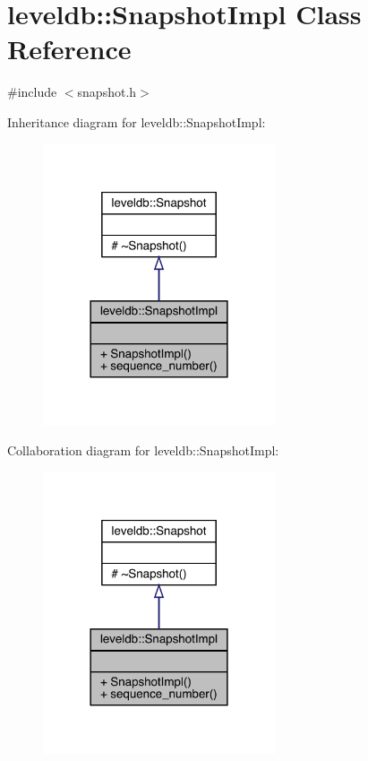 \hypertarget{classleveldb_1_1_snapshot_impl}{}\section{leveldb\+::Snapshot\+Impl Class Reference}
\label{classleveldb_1_1_snapshot_impl}


{\ttfamily \#include $<$snapshot.\+h$>$}



Inheritance diagram for leveldb\+::Snapshot\+Impl\+:
\nopagebreak
\begin{figure}[H]
\begin{center}
\leavevmode
\includegraphics[width=194pt]{classleveldb_1_1_snapshot_impl__inherit__graph}
\end{center}
\end{figure}


Collaboration diagram for leveldb\+::Snapshot\+Impl\+:
\nopagebreak
\begin{figure}[H]
\begin{center}
\leavevmode
\includegraphics[width=194pt]{classleveldb_1_1_snapshot_impl__coll__graph}
\end{center}
\end{figure}
